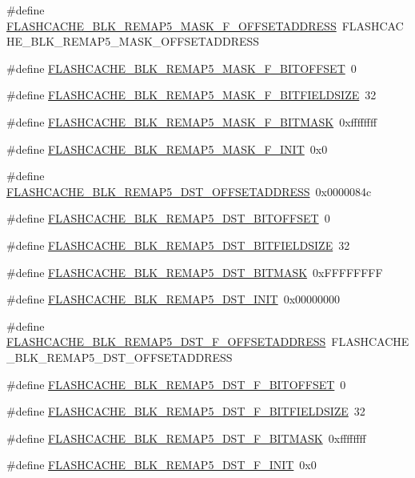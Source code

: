 \begin{DoxyCompactItemize}
\#define \hyperlink{a00550_a0948f0e84e1939a5e9c3bcdb156e4b50}{FLASHCACHE\_\-BLK\_\-REMAP5\_\-MASK\_\-F\_\-OFFSETADDRESS}~FLASHCACHE\_\-BLK\_\-REMAP5\_\-MASK\_\-OFFSETADDRESS
\item 
\#define \hyperlink{a00550_adaa6fc4ec7a133e49bc06be4a7a255e6}{FLASHCACHE\_\-BLK\_\-REMAP5\_\-MASK\_\-F\_\-BITOFFSET}~0
\item 
\#define \hyperlink{a00550_a7d4cadee6feb57d5fe0eae192bf1ba90}{FLASHCACHE\_\-BLK\_\-REMAP5\_\-MASK\_\-F\_\-BITFIELDSIZE}~32
\item 
\#define \hyperlink{a00550_ad24921144be42dcf9c43bf7b644cd440}{FLASHCACHE\_\-BLK\_\-REMAP5\_\-MASK\_\-F\_\-BITMASK}~0xffffffff
\item 
\#define \hyperlink{a00550_a605a272db952e97ba42c9a35263ba0e5}{FLASHCACHE\_\-BLK\_\-REMAP5\_\-MASK\_\-F\_\-INIT}~0x0
\item 
\#define \hyperlink{a00550_affdaaa1da407975c80ab297ece397e5c}{FLASHCACHE\_\-BLK\_\-REMAP5\_\-DST\_\-OFFSETADDRESS}~0x0000084c
\item 
\#define \hyperlink{a00550_a467e13ed97209d846d3a31c7d8c4041e}{FLASHCACHE\_\-BLK\_\-REMAP5\_\-DST\_\-BITOFFSET}~0
\item 
\#define \hyperlink{a00550_ab6035137a9ff2c953f41cdc17b3440c7}{FLASHCACHE\_\-BLK\_\-REMAP5\_\-DST\_\-BITFIELDSIZE}~32
\item 
\#define \hyperlink{a00550_a95e59d442cd526327a08e6376cfd01e0}{FLASHCACHE\_\-BLK\_\-REMAP5\_\-DST\_\-BITMASK}~0xFFFFFFFF
\item 
\#define \hyperlink{a00550_a421d8fd10711f02831d40771713dc8f0}{FLASHCACHE\_\-BLK\_\-REMAP5\_\-DST\_\-INIT}~0x00000000
\item 
\#define \hyperlink{a00550_a235bc448e66ab8eb9bf0602ad3f5597e}{FLASHCACHE\_\-BLK\_\-REMAP5\_\-DST\_\-F\_\-OFFSETADDRESS}~FLASHCACHE\_\-BLK\_\-REMAP5\_\-DST\_\-OFFSETADDRESS
\item 
\#define \hyperlink{a00550_a2f5e6fcaae73f2b20f885fa5fa3ccd18}{FLASHCACHE\_\-BLK\_\-REMAP5\_\-DST\_\-F\_\-BITOFFSET}~0
\item 
\#define \hyperlink{a00550_ae7c2c81da84557c39fdb6d99e0e6da39}{FLASHCACHE\_\-BLK\_\-REMAP5\_\-DST\_\-F\_\-BITFIELDSIZE}~32
\item 
\#define \hyperlink{a00550_a8280e2af01c55d029dc8e26c255e629c}{FLASHCACHE\_\-BLK\_\-REMAP5\_\-DST\_\-F\_\-BITMASK}~0xffffffff
\item 
\#define \hyperlink{a00550_aa2fee0f1a392e1d4e86ae854febd8bc1}{FLASHCACHE\_\-BLK\_\-REMAP5\_\-DST\_\-F\_\-INIT}~0x0
\item 

\end{DoxyCompactItemize}
